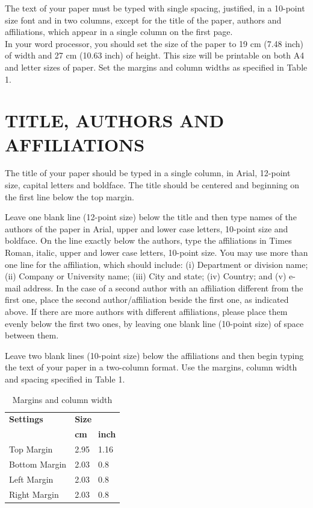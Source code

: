 \documentclass[conference,compsoc]{IEEEtran}
\begin{document}
\newpage

The text of your paper must be typed with single spacing, justified, in a 10-point size font and in two columns, except for the title of the paper, authors and affiliations, which appear in a single column on the first page.\\

In your word processor, you should set the size of the paper to 19 cm (7.48 inch) of width and 27 cm (10.63 inch) of height. This size will be printable on both A4 and letter sizes of paper. Set the margins and column widths as specified in Table 1.



\section{TITLE, AUTHORS AND AFFILIATIONS}
The title of your paper should be typed in a single column, in Arial, 12-point size, capital letters and boldface. The title should be centered and beginning on the first line below the top margin.

Leave one blank line (12-point size) below the title and then type names of the authors of the paper in Arial, upper and lower case letters, 10-point size and boldface. On the line exactly below the authors, type the affiliations in Times Roman, italic, upper and lower case letters, 10-point size. You may use more than one line for the affiliation, which should include: (i) Department or division name; (ii) Company or University name; (iii) City and state; (iv) Country; and (v) e-mail address. In the case of a second author with an affiliation different from the first one, place the second author/affiliation beside the first one, as indicated above. If there are more authors with different affiliations, please place them evenly below the first two ones, by leaving one blank line (10-point size) of space between them.

Leave two blank lines (10-point size) below the affiliations and then begin typing the text of your paper in a two-column format. Use the margins, column width and spacing specified in Table 1.\\
\begin{table}[ht]\centering
\caption{Margins and column width}
\begin{tabular}{|l|p{50pt}|p{51pt}|}
\hline
\textbf{Settings} & \multicolumn{2}{|p{102pt}|}{\textbf{Size}}\\ \cline{2-3}
  &\textbf{cm}&\textbf{inch}\\
\hline
Top Margin&2.95&1.16\\
\hline
Bottom Margin&2.03&0.8\\
\hline
Left Margin&2.03&0.8\\
\hline
Right Margin&2.03&0.8\\
\hline
\end{tabular}
\end{table}
\end{document}
